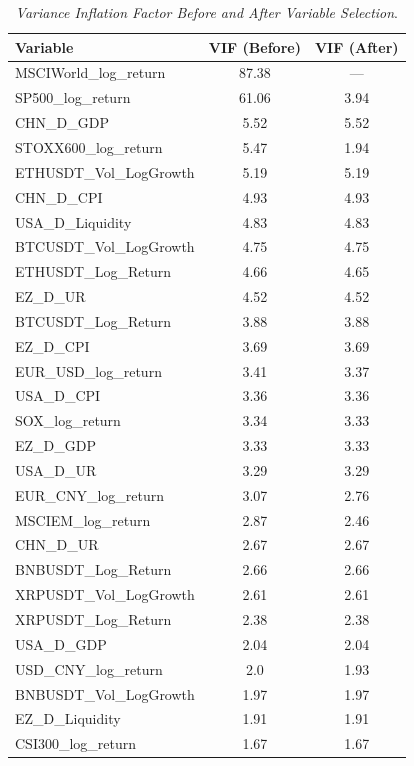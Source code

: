 \begin{table}[ht]
  \centering
  \caption{\textit{Variance Inflation Factor Before and After Variable Selection}.}
  \label{tab:vif_combined}
  \begin{tabular}{lcc}
    \toprule
    \textbf{Variable} & \textbf{VIF (Before)} & \textbf{VIF (After)} \\ 
    \midrule
    MSCIWorld\_log\_return & 87.38 & — \\ 
    SP500\_log\_return & 61.06 & 3.94 \\ 
    CHN\_D\_GDP & 5.52 & 5.52 \\ 
    STOXX600\_log\_return & 5.47 & 1.94 \\ 
    ETHUSDT\_Vol\_LogGrowth & 5.19 & 5.19 \\ 
    CHN\_D\_CPI & 4.93 & 4.93 \\ 
    USA\_D\_Liquidity & 4.83 & 4.83 \\ 
    BTCUSDT\_Vol\_LogGrowth & 4.75 & 4.75 \\ 
    ETHUSDT\_Log\_Return & 4.66 & 4.65 \\ 
    EZ\_D\_UR & 4.52 & 4.52 \\ 
    BTCUSDT\_Log\_Return & 3.88 & 3.88 \\ 
    EZ\_D\_CPI & 3.69 & 3.69 \\ 
    EUR\_USD\_log\_return & 3.41 & 3.37 \\ 
    USA\_D\_CPI & 3.36 & 3.36 \\ 
    SOX\_log\_return & 3.34 & 3.33 \\ 
    EZ\_D\_GDP & 3.33 & 3.33 \\ 
    USA\_D\_UR & 3.29 & 3.29 \\ 
    EUR\_CNY\_log\_return & 3.07 & 2.76 \\ 
    MSCIEM\_log\_return & 2.87 & 2.46 \\ 
    CHN\_D\_UR & 2.67 & 2.67 \\ 
    BNBUSDT\_Log\_Return & 2.66 & 2.66 \\ 
    XRPUSDT\_Vol\_LogGrowth & 2.61 & 2.61 \\ 
    XRPUSDT\_Log\_Return & 2.38 & 2.38 \\ 
    USA\_D\_GDP & 2.04 & 2.04 \\ 
    USD\_CNY\_log\_return & 2.0 & 1.93 \\ 
    BNBUSDT\_Vol\_LogGrowth & 1.97 & 1.97 \\ 
    EZ\_D\_Liquidity & 1.91 & 1.91 \\ 
    CSI300\_log\_return & 1.67 & 1.67 \\ 

\end{tabular}
\end{table}
